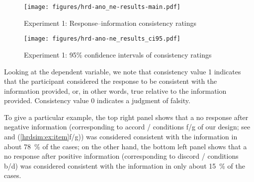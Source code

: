 \documentclass[output=paper,colorlinks,citecolor=brown]{langscibook}
\begin{document}
\begin{figure}
    \texttt{[image: figures/hrd-ano\_ne-results-main.pdf]}
    \caption{Experiment 1: Response--information consistency ratings}
    \label{hrdsim:fig:results}
\end{figure}

\begin{figure}
    \texttt{[image: figures/hrd-ano-ne\_results\_ci95.pdf]}
    \caption{Experiment 1: 95\% confidence intervals of consistency ratings}
    \label{hrdsim:fig:emmeans-e1}
\end{figure}


Looking at the dependent variable, we note that consistency value 1 indicates that the participant considered the response to be consistent with the information provided, or, in other words, true relative to the information provided. Consistency value 0 indicates a judgment of falsity.

To give a particular example, the top right panel shows that a \textsf{no} response after \textsf{negative} information (corresponding to \textsf{accord} / conditions f/g of our design; see  and (\ref{hrdsim:ex:item}f/g)) was considered consistent with the information in about \qty{78}{\percent} of the cases; on the other hand, the bottom left panel shows that a \textsf{no} response after \textsf{positive} information (corresponding to \textsf{discord} / conditions b/d) was considered consistent with the information in only about \qty{15}{\percent} of the cases.

\end{document}
